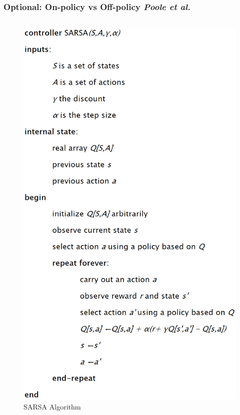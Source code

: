 \documentclass{beamer}
\begin{document}
    \begin{frame}
      \frametitle{Optional: On-policy vs Off-policy \scriptsize{\textit{Poole et al.}}}
      \begin{columns}[b]
          \centering
          \begin{figure}
            \includegraphics[height=.75\textheight]{Images/SARSA.png}
            \caption{SARSA Algorithm}
            \label{fig:SARSAAlgorithm}
          \end{figure}

\end{columns}
\end{frame}
\end{document}
